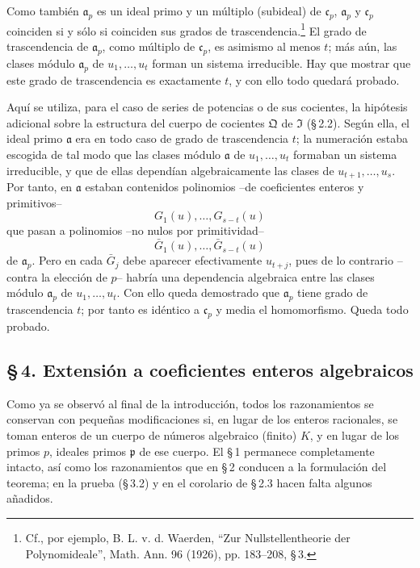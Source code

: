 Como también $\mathfrak{a}_p$ es un ideal primo y un múltiplo (subideal) de $\mathfrak{c}_p$, $\mathfrak{a}_p$ y $\mathfrak{c}_p$ coinciden si y sólo si coinciden sus grados de trascendencia.\footnote{Cf., por ejemplo, B. L. v. d. Waerden, ``Zur Nullstellentheorie der Polynomideale'', Math. Ann. 96 (1926), pp. 183--208, \S\,3.} El grado de trascendencia de $\mathfrak{a}_p$, como múltiplo de $\mathfrak{c}_p$, es asimismo al menos $t$; más aún, las clases módulo $\mathfrak{a}_p$ de $u_1,\ldots,u_t$ forman un sistema irreducible. Hay que mostrar que este grado de trascendencia es exactamente $t$, y con ello todo quedará probado.

Aquí se utiliza, para el caso de series de potencias o de sus cocientes, la hipótesis adicional sobre la estructura del cuerpo de cocientes $\mathfrak{Q}$ de $\mathfrak{I}$ (\S\,2.2). Según ella, el ideal primo $\mathfrak{a}$ era en todo caso de grado de trascendencia $t$; la numeración estaba escogida de tal modo que las clases módulo $\mathfrak{a}$ de $u_1,\ldots,u_t$ formaban un sistema irreducible, y que de ellas dependían algebraicamente las clases de $u_{t+1},\ldots,u_s$. Por tanto, en $\mathfrak{a}$ estaban contenidos polinomios --de coeficientes enteros y primitivos--
\[
G_1(u),\ldots,G_{s-t}(u)\tag{1}
\]
que pasan a polinomios --no nulos por primitividad--
\[
\bar G_1(u),\ldots,\bar G_{s-t}(u)\tag{2}
\]
de $\mathfrak{a}_p$. Pero en cada $\bar G_j$ debe aparecer efectivamente $u_{t+j}$, pues de lo contrario --contra la elección de $p$-- habría una dependencia algebraica entre las clases módulo $\mathfrak{a}_p$ de $u_1,\ldots,u_t$. Con ello queda demostrado que $\mathfrak{a}_p$ tiene grado de trascendencia $t$; por tanto es idéntico a $\mathfrak{c}_p$ y media el homomorfismo. Queda todo probado.

\subsection*{\S\,4. Extensión a coeficientes enteros algebraicos}

Como ya se observó al final de la introducción, todos los razonamientos se conservan con pequeñas modificaciones si, en lugar de los enteros racionales, se toman enteros de un cuerpo de números algebraico (finito) $K$, y en lugar de los primos $p$, ideales primos $\mathfrak{p}$ de ese cuerpo. El \S\,1 permanece completamente intacto, así como los razonamientos que en \S\,2 conducen a la formulación del teorema; en la prueba (\S\,3.2) y en el corolario de \S\,2.3 hacen falta algunos añadidos.

